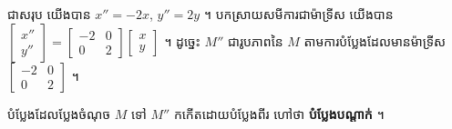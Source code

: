 ជាសរុប យើងបាន $x'' = -2x$, $y'' = 2y$ ។ បកស្រាយសមីការជាម៉ាទ្រីស យើងបាន $\begin{bmatrix} x''\\ y'' \end{bmatrix} = \begin{bmatrix} -2 & 0\\ 0 & 2 \end{bmatrix}\begin{bmatrix} x\\ y \end{bmatrix}$ ។ ដូច្នេះ $M''$ ជារូបភាពនៃ $M$ តាមការបំប្លែងដែលមានម៉ាទ្រីស $\begin{bmatrix} -2 & 0\\ 0 & 2 \end{bmatrix}$ ។

បំប្លែងដែលប្លែងចំណុច $M$ ទៅ $M''$ កកើតដោយបំប្លែងពីរ ហៅថា \textbf{បំប្លែងបណ្ដាក់} ។


